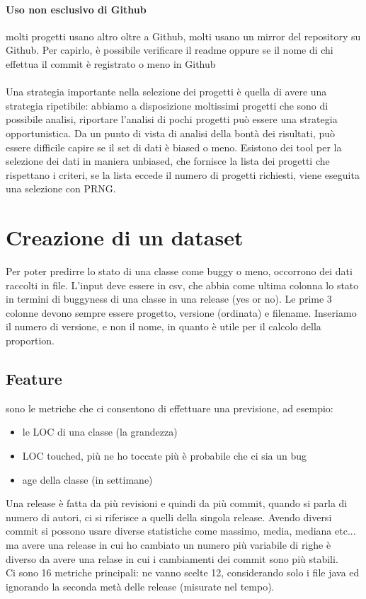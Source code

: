 \documentclass{article}
\begin{document}
\paragraph{Uso non esclusivo di Github}molti progetti usano altro oltre a Github, molti usano un mirror del repository su Github. Per capirlo, è possibile verificare il readme oppure se il nome di chi effettua il commit è registrato o meno in Github\\\\ Una strategia importante nella selezione dei progetti è quella di avere una strategia ripetibile: abbiamo a disposizione moltissimi progetti che sono di possibile analisi, riportare l'analisi di pochi progetti può essere una strategia opportunistica. Da un punto di vista di analisi della bontà dei risultati, può essere difficile capire se il set di dati è biased o meno. Esistono dei tool per la selezione dei dati in maniera unbiased, che fornisce la lista dei progetti che rispettano i criteri, se la lista eccede il numero di progetti richiesti, viene eseguita una selezione con PRNG.
\section{Creazione di un dataset}
Per poter predirre lo stato di una classe come buggy o meno, occorrono dei dati raccolti in file. L'input deve essere in csv, che abbia come ultima colonna lo stato in termini di buggyness di una classe in una release (yes or no). Le prime 3 colonne devono sempre essere progetto, versione (ordinata) e filename. Inseriamo il numero di versione, e non il nome, in quanto è utile per il calcolo della proportion.
\subsection{Feature}sono le metriche che ci consentono di effettuare una previsione, ad esempio:
\begin{itemize}
\item le LOC di una classe (la grandezza)
\item LOC touched, più ne ho toccate più è probabile che ci sia un bug
\item age della classe (in settimane)
\end{itemize}
Una release è fatta da più revisioni e quindi da più commit, quando si parla di numero di autori, ci si riferisce a quelli della singola release. Avendo diversi commit si possono usare diverse statistiche come massimo, media, mediana etc... ma avere una release in cui ho cambiato un numero più variabile di righe è diverso da avere una relase in cui i cambiamenti dei commit sono più stabili.\\ Ci sono 16 metriche principali: ne vanno scelte 12, considerando solo i file java ed ignorando la seconda metà delle release (misurate nel tempo).
\end{document}
